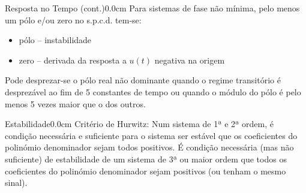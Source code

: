 \documentclass[portuguese,10pt,3col]{cheatsheet}
\begin{document}
\begin{multicols}{3}
\begin{cheatsheetbox}{Resposta no Tempo (cont.)}{0.0cm}
    Para sistemas de fase não mínima, pelo menos um pólo e/ou zero no s.p.c.d. tem-se:
    \begin{itemize}
        \item pólo -- instabilidade
        \item zero -- derivada da resposta a $u(t)$ negativa na origem 
    \end{itemize}
    
    Pode desprezar-se o pólo real não dominante quando o regime transitório é desprezável ao fim de 5 constantes de tempo ou quando o módulo do pólo é pelo menos 5 vezes maior que o dos outros.
\end{cheatsheetbox}

\begin{cheatsheetbox}{Estabilidade}{0.0cm}
    Critério de Hurwitz: Num sistema de 1ª e 2ª ordem, é condição necessária e suficiente para o sistema ser estável que os coeficientes do polinómio denominador sejam todos positivos. É condição necessária (mas não suficiente) de estabilidade de um sistema de 3ª ou maior ordem que todos os coeficientes do polinómio denominador sejam positivos (ou tenham o mesmo sinal).
\end{cheatsheetbox}


\end{multicols}
\end{document}

